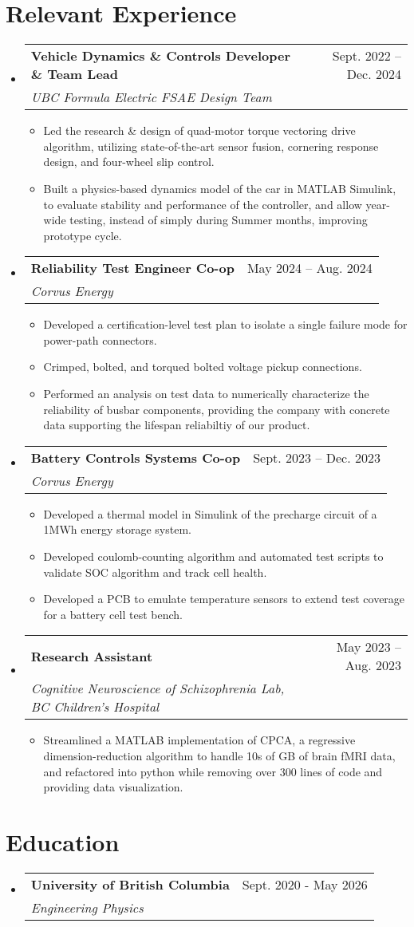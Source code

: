 \documentclass[letterpaper,11pt]{article}
\makeatletter
\newcommand{\resumeItem}[1]{
  \item\small{
    {#1 \vspace{-2pt}}
  }
}
\newcommand{\resumeSubheading}[4]{
  \vspace{-2pt}\item
    \begin{tabular*}{0.97\textwidth}[t]{l@{\extracolsep{\fill}}r}
      \textbf{#1} & #2 \\
      \textit{\small#3} & \textit{\small #4} \\
    \end{tabular*}\vspace{-7pt}
}
\newcommand{\resumeSubHeadingListStart}{\begin{itemize}[leftmargin=0.15in, label={}]}
\newcommand{\resumeSubHeadingListEnd}{\end{itemize}}
\newcommand{\resumeItemListStart}{\begin{itemize}}
\newcommand{\resumeItemListEnd}{\end{itemize}\vspace{-5pt}}
\makeatother
\begin{document}
\section{Relevant Experience}
  \resumeSubHeadingListStart
\vspace{1mm}
  \resumeSubheading
      {Vehicle Dynamics \& Controls Developer \& Team Lead}{Sept. 2022 -- Dec. 2024}
      {UBC Formula Electric FSAE Design Team}{}
      \resumeItemListStart
        \resumeItem{Led the research \& design of quad-motor torque vectoring drive algorithm, utilizing state-of-the-art sensor fusion, cornering response design, and four-wheel slip control.}
        \resumeItem{Built a physics-based dynamics model of the car in MATLAB Simulink, to evaluate stability and performance of the controller, and allow year-wide testing, instead 
        of simply during Summer months, improving prototype cycle.}
      \resumeItemListEnd
\vspace{1mm}
    \resumeSubheading
      {Reliability Test Engineer Co-op}{May 2024 -- Aug. 2024}
      {Corvus Energy}{}
      \resumeItemListStart
        \resumeItem{Developed a certification-level test plan to isolate a single failure mode for power-path connectors.}
        \resumeItem{Crimped, bolted, and torqued bolted voltage pickup connections.}
        \resumeItem{Performed an analysis on test data to numerically characterize the reliability of busbar components, providing the company with concrete data supporting the lifespan reliabiltiy of our product.}
      \resumeItemListEnd
\vspace{1mm}
    \resumeSubheading
      {Battery Controls Systems Co-op}{Sept. 2023 -- Dec. 2023}
      {Corvus Energy}{}
      \resumeItemListStart
        \resumeItem{Developed a thermal model in Simulink of the precharge circuit of a 1MWh energy storage system.}
        \resumeItem{Developed coulomb-counting algorithm and automated test scripts to validate SOC algorithm and track cell health.}
        \resumeItem{Developed a PCB to emulate temperature sensors to extend test coverage for a battery cell test bench.}
      \resumeItemListEnd
\vspace{1mm}
    \resumeSubheading
      {Research Assistant}{May 2023 -- Aug. 2023}
      {Cognitive Neuroscience of Schizophrenia Lab, BC Children's Hospital}{}
      \resumeItemListStart
        \resumeItem{Streamlined a MATLAB implementation of CPCA, a 
        regressive dimension-reduction algorithm 
        to handle 10s of GB of brain fMRI data, and refactored into python
         while removing over 300 lines of code and providing data visualization.}
      \resumeItemListEnd
  \resumeSubHeadingListEnd


\section{Education}
  \resumeSubHeadingListStart
    \resumeSubheading
      {University of British Columbia}{Sept. 2020 - May 2026}
      {Engineering Physics}{}
  \resumeSubHeadingListEnd

\vspace{-3mm}
\end{document}
